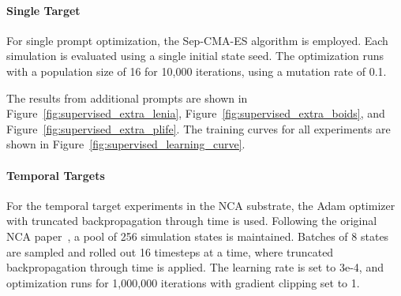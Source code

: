 \documentclass{article}
\begin{document}
\paragraph{\textbf{Single Target}}
For single prompt optimization, the Sep-CMA-ES algorithm is employed.
Each simulation is evaluated using a single initial state seed.
The optimization runs with a population size of 16 for 10,000 iterations, using a mutation rate of 0.1.

The results from additional prompts are shown in Figure~\ref{fig:supervised_extra_lenia},
Figure~\ref{fig:supervised_extra_boids}, and
Figure~\ref{fig:supervised_extra_plife}.
The training curves for all experiments are shown in Figure~\ref{fig:supervised_learning_curve}.





\paragraph{\textbf{Temporal Targets}}
For the temporal target experiments in the NCA substrate, the Adam optimizer with truncated backpropagation through time is used.
Following the original NCA paper~\citep{mordvintsev2020growing}, a pool of 256 simulation states is maintained.
Batches of 8 states are sampled and rolled out 16 timesteps at a time, where truncated backpropagation through time is applied.
The learning rate is set to 3e-4, and optimization runs for 1,000,000 iterations with gradient clipping set to 1.
\end{document}

